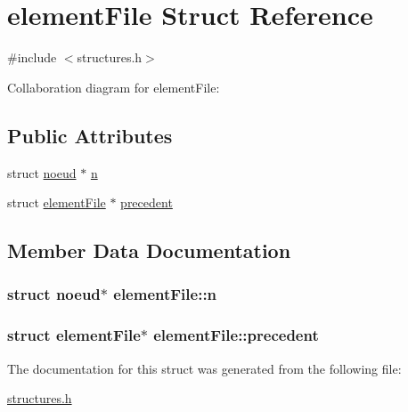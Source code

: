 \hypertarget{structelementFile}{\section{element\+File Struct Reference}
\label{structelementFile}
}


{\ttfamily \#include $<$structures.\+h$>$}



Collaboration diagram for element\+File\+:
\subsection*{Public Attributes}
\begin{DoxyCompactItemize}
\item 
struct \hyperlink{structnoeud}{noeud} $\ast$ \hyperlink{structelementFile_a329f16b6bc24f119951449fb40f0635e}{n}
\item 
struct \hyperlink{structelementFile}{element\+File} $\ast$ \hyperlink{structelementFile_a9ed0d82cc802e981e26165f1f873b0f8}{precedent}
\end{DoxyCompactItemize}


\subsection{Member Data Documentation}
\hypertarget{structelementFile_a329f16b6bc24f119951449fb40f0635e}{
\subsubsection[{n}]{\setlength{\rightskip}{0pt plus 5cm}struct {\bf noeud}$\ast$ element\+File\+::n}}\label{structelementFile_a329f16b6bc24f119951449fb40f0635e}
\hypertarget{structelementFile_a9ed0d82cc802e981e26165f1f873b0f8}{
\subsubsection[{precedent}]{\setlength{\rightskip}{0pt plus 5cm}struct {\bf element\+File}$\ast$ element\+File\+::precedent}}\label{structelementFile_a9ed0d82cc802e981e26165f1f873b0f8}


The documentation for this struct was generated from the following file\+:\begin{DoxyCompactItemize}
\item 
\hyperlink{structures_8h}{structures.\+h}\end{DoxyCompactItemize}
